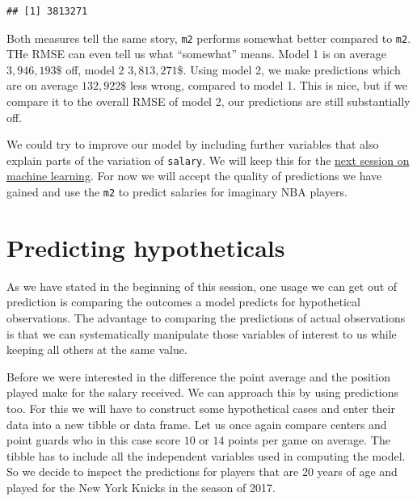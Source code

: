 \documentclass[
]{book}
\begin{document}
\begin{verbatim}
## [1] 3813271
\end{verbatim}

Both measures tell the same story, \texttt{m2} performs somewhat better compared to
\texttt{m2}. THe RMSE can even tell us what ``somewhat'' means. Model 1 is on average
\(3,946,193\$\) off, model 2 \(3,813,271\$\). Using model 2, we make predictions
which are on average \(132,922\$\) less wrong, compared to model 1. This is nice,
but if we compare it to the overall RMSE of model 2, our predictions are still
substantially off.

We could try to improve our model by including further variables
that also explain parts of the variation of \texttt{salary}. We will keep this for the
\protect\hyperlink{ml}{next session on machine learning}. For now we will accept the quality of
predictions we have gained and use the \texttt{m2} to predict salaries for imaginary
NBA players.

\hypertarget{predicting-hypotheticals}{%
\section{Predicting hypotheticals}\label{predicting-hypotheticals}}

As we have stated in the beginning of this session, one usage we can get out
of prediction is comparing the outcomes a model predicts for hypothetical
observations. The advantage to comparing the predictions of actual observations
is that we can systematically manipulate those variables of interest to us
while keeping all others at the same value.

Before we were interested in the difference the point average and the position
played make for the salary received. We can approach this by using
predictions too. For this we will have to construct some hypothetical cases and
enter their data into a new tibble or data frame. Let us once again compare
centers and point guards who in this case score \(10\) or \(14\) points per game on
average. The tibble has to include all the independent variables used in
computing the model. So we decide to inspect the predictions for players that
are 20 years of age and played for the New York Knicks in the season of 2017.
\end{document}
